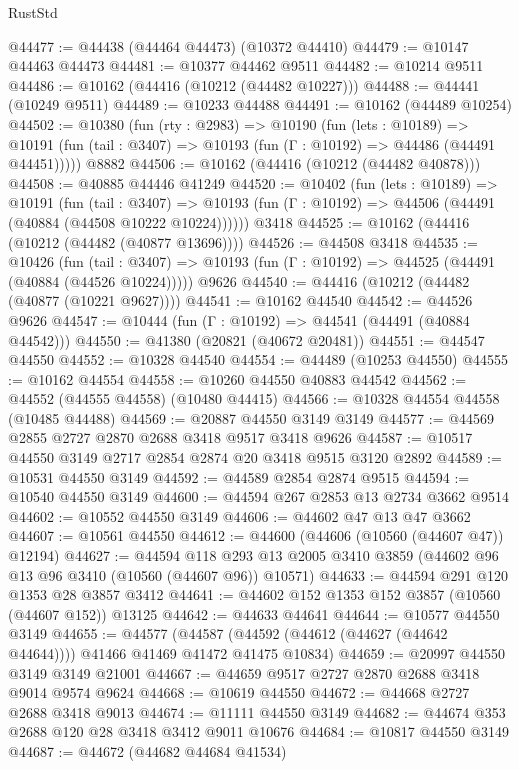 \begin{lexlean}{RustStd}
\begin{coremodule}
@44477 := @44438 (@44464 @44473) (@10372 @44410)
@44479 := @10147 @44463 @44473
@44481 := @10377 @44462 @9511
@44482 := @10214 @9511
@44486 := @10162 (@44416 (@10212 (@44482 @10227)))
@44488 := @44441 (@10249 @9511)
@44489 := @10233 @44488
@44491 := @10162 (@44489 @10254)
@44502 := @10380
    (fun (rty : @2983) =>
    @10190
      (fun (lets : @10189) =>
      @10191 (fun (tail : @3407) => @10193 (fun (Γ : @10192) => @44486 (@44491 @44451)))))
    @8882
@44506 := @10162 (@44416 (@10212 (@44482 @40878)))
@44508 := @40885 @44446 @41249
@44520 := @10402
    (fun (lets : @10189) =>
    @10191
      (fun (tail : @3407) =>
      @10193 (fun (Γ : @10192) => @44506 (@44491 (@40884 (@44508 @10222 @10224))))))
    @3418
@44525 := @10162 (@44416 (@10212 (@44482 (@40877 @13696))))
@44526 := @44508 @3418
@44535 := @10426
    (fun (tail : @3407) => @10193 (fun (Γ : @10192) => @44525 (@44491 (@40884 (@44526 @10224)))))
    @9626
@44540 := @44416 (@10212 (@44482 (@40877 (@10221 @9627))))
@44541 := @10162 @44540
@44542 := @44526 @9626
@44547 := @10444 (fun (Γ : @10192) => @44541 (@44491 (@40884 @44542)))
@44550 := @41380 (@20821 (@40672 @20481))
@44551 := @44547 @44550
@44552 := @10328 @44540
@44554 := @44489 (@10253 @44550)
@44555 := @10162 @44554
@44558 := @10260 @44550 @40883 @44542
@44562 := @44552 (@44555 @44558) (@10480 @44415)
@44566 := @10328 @44554 @44558 (@10485 @44488)
@44569 := @20887 @44550 @3149 @3149
@44577 := @44569 @2855 @2727 @2870 @2688 @3418 @9517 @3418 @9626
@44587 := @10517 @44550 @3149 @2717 @2854 @2874 @20 @3418 @9515 @3120 @2892
@44589 := @10531 @44550 @3149
@44592 := @44589 @2854 @2874 @9515
@44594 := @10540 @44550 @3149
@44600 := @44594 @267 @2853 @13 @2734 @3662 @9514
@44602 := @10552 @44550 @3149
@44606 := @44602 @47 @13 @47 @3662
@44607 := @10561 @44550
@44612 := @44600 (@44606 (@10560 (@44607 @47)) @12194)
@44627 := @44594
    @118
    @293
    @13
    @2005
    @3410
    @3859
    (@44602 @96 @13 @96 @3410 (@10560 (@44607 @96)) @10571)
@44633 := @44594 @291 @120 @1353 @28 @3857 @3412
@44641 := @44602 @152 @1353 @152 @3857 (@10560 (@44607 @152)) @13125
@44642 := @44633 @44641
@44644 := @10577 @44550 @3149
@44655 := @44577
    (@44587 (@44592 (@44612 (@44627 (@44642 @44644)))) @41466 @41469 @41472 @41475 @10834)
@44659 := @20997 @44550 @3149 @3149 @21001
@44667 := @44659 @9517 @2727 @2870 @2688 @3418 @9014 @9574 @9624
@44668 := @10619 @44550
@44672 := @44668 @2727 @2688 @3418 @9013
@44674 := @11111 @44550 @3149
@44682 := @44674 @353 @2688 @120 @28 @3418 @3412 @9011 @10676
@44684 := @10817 @44550 @3149
@44687 := @44672 (@44682 @44684 @41534)

\end{coremodule}
\end{lexlean}
